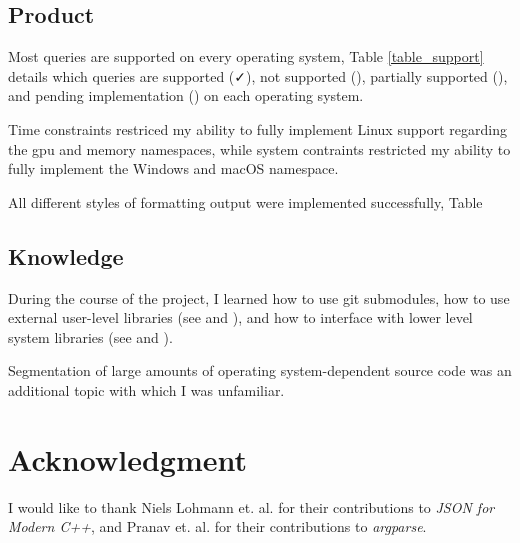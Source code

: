 \documentclass[conference]{IEEEtran}
\begin{document}
\subsection{Product}
Most queries are supported on every operating system, Table \ref{table_support} details which queries are
supported (\faCheck), not supported (\faTimes), partially supported (\faPlus), and pending implementation (\faMinus)
on each operating system.

Time constraints restriced my ability to fully implement Linux support regarding the gpu and memory namespaces,
while system contraints restricted my ability to fully implement the Windows and macOS namespace.

All different styles of formatting output were implemented successfully, Table

\subsection{Knowledge}
During the course of the project, I learned how to use git submodules, how to use external user-level libraries (see \cite{lohmann:json} and \cite{pranav:argparse}),
and how to interface with lower level system libraries (see \cite{whims:wmi} and \cite{dicanio:winreg}).

Segmentation of large amounts of operating system-dependent source code was an additional topic with which I was unfamiliar.

\section*{Acknowledgment}

I would like to thank Niels Lohmann et. al. for their contributions to \textit{JSON for Modern C++},
and Pranav et. al. for their contributions to \textit{argparse}.

\newpage
\end{document}
